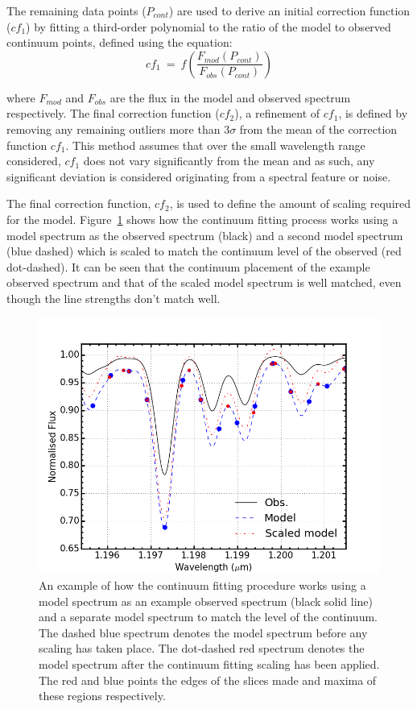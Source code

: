 \documentclass[12pt]{article}
\begin{document}
The remaining data points ($P_{cont}$) are used to derive an initial correction function
($cf_{1}$) by fitting a third-order polynomial to the ratio of the model to observed continuum points, defined using the equation:
\begin{equation}
    cf_{1}~=~f(\frac{F_{mod}(P_{cont})}{F_{obs}(P_{cont})})
\end{equation}

\noindent where $F_{mod}$ and $F_{obs}$ are the flux in the model and observed spectrum respectively.
The final correction function ($cf_{2}$), a refinement of $cf_{1}$,
is defined by removing any remaining outliers more than 3$\sigma$ from the mean of the correction function $cf_{1}$.
This method assumes that over the small wavelength range considered,
$cf_{1}$ does not vary significantly from the mean and as such, any significant deviation is considered originating from a spectral feature or noise.

The final correction function, $cf_{2}$,
is used to define the amount of scaling required for the model.
Figure~\ref{fig:cftaction} shows how the continuum fitting process works using a model spectrum as the observed spectrum (black) and a second model spectrum
(blue dashed) which is scaled to match the continuum level of the observed
(red dot-dashed).
It can be seen that the continuum placement of the example observed spectrum and that of the scaled model spectrum is well matched, even though the line strengths don't match well.

\begin{figure}
 \centering
\includegraphics[width=\textwidth]{cftaction}
\caption[Example of continuum fitting]{
An example of how the continuum fitting procedure works using a model spectrum as
an example observed spectrum (black solid line)
and a separate model spectrum to match the level of the continuum.
The dashed blue spectrum denotes the model spectrum before any scaling has taken place.
The dot-dashed red spectrum denotes the model spectrum after the continuum fitting scaling has been applied.
The red and blue points the edges of the slices made and maxima of these regions respectively.\label{fig:cftaction}
         }
\end{figure}
\end{document}
